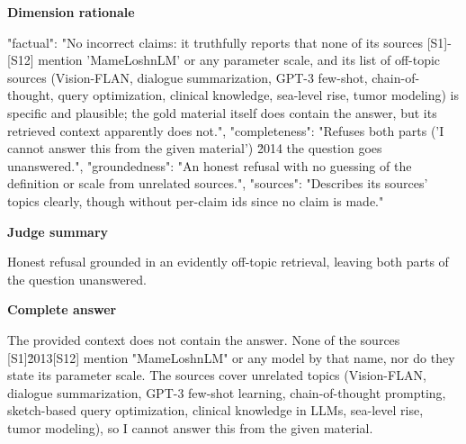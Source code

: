 \documentclass[10pt]{article}
\begin{document}
\textbf{Dimension rationale}
\begin{EvidenceText}
{
  "factual": "No incorrect claims: it truthfully reports that none of its sources [S1]-[S12] mention 'MameLoshnLM' or any parameter scale, and its list of off-topic sources (Vision-FLAN, dialogue summarization, GPT-3 few-shot, chain-of-thought, query optimization, clinical knowledge, sea-level rise, tumor modeling) is specific and plausible; the gold material itself does contain the answer, but its retrieved context apparently does not.",
  "completeness": "Refuses both parts ('I cannot answer this from the given material') \u2014 the question goes unanswered.",
  "groundedness": "An honest refusal with no guessing of the definition or scale from unrelated sources.",
  "sources": "Describes its sources' topics clearly, though without per-claim ids since no claim is made."
}
\end{EvidenceText}

\textbf{Judge summary}
\begin{EvidenceText}
Honest refusal grounded in an evidently off-topic retrieval, leaving both parts of the question unanswered.
\end{EvidenceText}

\textbf{Complete answer}
\begin{AnswerText}
The provided context does not contain the answer. None of the sources [S1]\u2013[S12] mention "MameLoshnLM" or any model by that name, nor do they state its parameter scale. The sources cover unrelated topics (Vision-FLAN, dialogue summarization, GPT-3 few-shot learning, chain-of-thought prompting, sketch-based query optimization, clinical knowledge in LLMs, sea-level rise, tumor modeling), so I cannot answer this from the given material.
\end{AnswerText}
\end{document}
